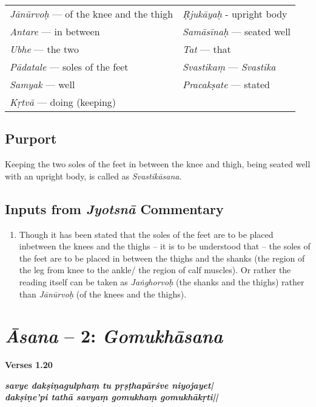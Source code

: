 \begin{longtable}{>{\noindent\raggedright}p{5cm}>{\noindent\raggedright}p{5cm}}
\textit{Jānūrvoḥ} --- of the knee and the thigh & \textit{Ṛjukāyaḥ} - upright body\tabularnewline
\textit{Antare} --- in  between & \textit{Samāsīnaḥ} --- seated well\tabularnewline
\textit{Ubhe} --- the two & \textit{Tat} --- that\tabularnewline
\textit{Pādatale} --- soles of the feet & \textit{Svastikaṃ} --- \textit{Svastika}\tabularnewline
\textit{Samyak} --- well & \textit{Pracakṣate} --- stated\tabularnewline
\textit{Kṛtvā} --- doing (keeping) & 
\end{longtable}
\vspace{-5pt}

\subsection*{Purport}

\vspace{-10pt}

Keeping the two soles of the feet in between the knee and thigh, being seated well with an upright body, is called as \textit{Svastikāsana}.

\subsection*{Inputs from \textit{Jyotsnā} Commentary}

\begin{enumerate}
\item Though it has been stated that the soles of the feet are to be placed inbetween the knees and the thighs – it is to be understood that – the soles of the feet are to be placed in between the thighs and the shanks (the region of the leg from knee to the ankle/ the region of calf muscles). Or rather the reading itself can be taken as \textit{Jaṅghorvoḥ} (the shanks and the thighs) rather than \textit{Jānūrvoḥ} (of the knees and the thighs).
\end{enumerate}

\section*{\textit{Āsana} -- 2: \textit{Gomukhāsana}}

\noindent \textbf{Verses 1.20}

\begin{shloka}
\textit{\textbf{savye dakṣiṇagulphaṃ tu pṛṣṭhapārśve niyojayet|}\\
\textbf{dakṣiṇe'pi tathā savyaṃ gomukhaṃ gomukhākṛti||}}
\end{shloka}



